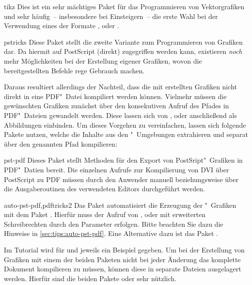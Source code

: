 \begin{packages}
\item[tikz]
  Dies ist ein sehr mächtiges Paket für das Programmieren von Vektorgrafiken 
  und sehr häufig~-- insbesondere bei Einsteigern~-- die erste Wahl bei der 
  Verwendung eines der Formate ,  oder 
  .
\item[pstricks]
  Diese Paket stellt die zweite Variante zum Programmieren von Grafiken dar. 
  Da hiermit auf PostScript (direkt) zugegriffen werden kann, existieren 
  \emph{noch} mehr Möglichkeiten bei der Erstellung eigener Grafiken, wovon
  die bereitgestellten Befehle rege Gebrauch machen.
  
  Daraus resultiert allerdings der Nachteil, dass die mit  
  erstellten Grafiken nicht direkt in eine PDF"~Datei kompiliert werden können. 
  Vielmehr müssen die gewünschten Grafiken zunächst über den konsekutiven 
  Aufruf des Pfades  in PDF"~Dateien gewandelt 
  werden. Diese lassen sich von ,  oder 
   anschließend als Abbildungen einbinden. Um dieses Vorgehen 
  zu vereinfachen, lassen sich folgende Pakete nutzen, welche die Inhalte aus 
  den "~Umgebungen extrahieren und separat über den 
  genannten Pfad kompilieren:
  \begin{packages}
  \item[pst-pdf]
    Dieses Paket stellt Methoden für den Export von PostSript"~Grafiken in 
    PDF"~Datien bereit. Die einzelnen Aufrufe zur Kompilierung von DVI über 
    PostScript zu PDF müssen durch den Anwender manuell beziehungsweise über 
    die Ausgaberoutinen des verwendeten Editors durchgeführt werden.
  \item[auto-pst-pdf,pdftricks2]
    Das Paket automatisiert die Erzeugung der "~Grafiken mit 
    dem Paket . Hierfür muss der Aufruf von , 
     oder  mit erweiterten Schreibrechten 
    durch den Parameter  erfolgen. Bitte beachten Sie 
    dazu die Hinweise in \autoref{sec:tips:auto-pst-pdf}. Eine Alternative dazu 
    ist das Paket .
  \end{packages}
\end{packages}
%
Im Tutorial  wird für  und  
jeweils ein Beispiel gegeben. Um bei der Erstellung von Grafiken mit einem der 
beiden Paketen nicht bei jeder Änderung das komplette Dokument kompilieren zu 
müssen, können diese in separate Dateien ausgelagert werden. Hierfür sind die 
beiden Pakete  oder  sehr nützlich.

